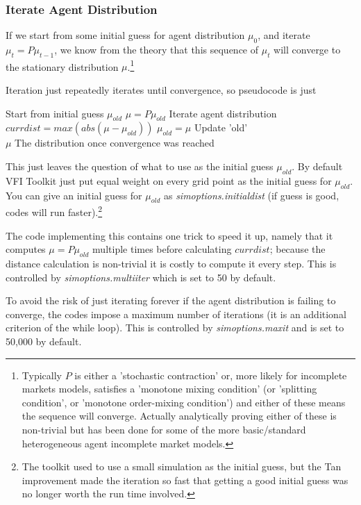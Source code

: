 \subsubsection{Iterate Agent Distribution}
If we start from some initial guess for agent distribution $\mu_0$, and iterate $\mu_t=P \mu_{t-1}$, we know from the theory that this sequence of $\mu_t$ will converge to the stationary distribution $\mu$.\footnote{Typically $P$ is either a 'stochastic contraction' or, more likely for incomplete markets models, satisfies a 'monotone mixing condition' (or 'splitting condition', or 'monotone order-mixing condition') and either of these means the sequence will converge. Actually analytically proving either of these is non-trivial but has been done for some of the more basic/standard heterogeneous agent incomplete market models.}

Iteration just repeatedly iterates until convergence, so pseudocode is just
\begin{algorithmic}
 \State Start from initial guess $\mu_{old}$
  \State $\mu=P \mu_{old}$ \Comment Iterate agent distribution
  \State $currdist=max(abs(\mu-\mu_{old}))$
  \State $\mu_{old}=\mu$ \Comment Update 'old'
 \EndWhile
 \\ \Return $\mu$ \Comment The distribution once convergence was reached
\end{algorithmic}
This just leaves the question of what to use as the initial guess $\mu_{old}$. By default VFI Toolkit just put equal weight on every grid point as the initial guess for $\mu_{old}$. You can give an initial guess for $\mu_{old}$ as \textit{simoptions.initialdist} (if guess is good, codes will run faster).\footnote{The toolkit used to use a small simulation as the initial guess, but the Tan improvement made the iteration so fast that getting a good initial guess was no longer worth the run time involved.}

The code implementing this contains one trick to speed it up, namely that it computes $\mu=P \mu_{old}$ multiple times before calculating $currdist$; because the distance calculation is non-trivial it is costly to compute it every step. This is controlled by \textit{simoptions.multiiter} which is set to 50 by default.

To avoid the risk of just iterating forever if the agent distribution is failing to converge, the codes impose a maximum number of iterations (it is an additional criterion of the while loop). This is controlled by \textit{simoptions.maxit} and is set to 50,000 by default.

